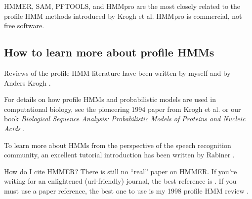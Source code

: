 HMMER, SAM, PFTOOLS, and HMMpro are the most closely related to the
profile HMM methods introduced by Krogh et al. HMMpro is commercial,
not free software.

\subsection{How to learn more about profile HMMs}

Reviews of the profile HMM literature have been written by myself
\cite{Eddy96,Eddy98} and by Anders Krogh \cite{Krogh98}.

For details on how profile HMMs and probabilistic models are used in
computational biology, see the pioneering 1994 paper from Krogh et
al. \cite{Krogh94} or our book \emph{Biological Sequence Analysis:
Probabilistic Models of Proteins and Nucleic Acids} \cite{Durbin98}.

To learn more about HMMs from the perspective of the speech
recognition community, an excellent tutorial introduction has been
written by Rabiner \cite{Rabiner89}.

\begin{srefaq}{How do I cite HMMER?}
There is still no ``real'' paper on HMMER. If you're writing for an
enlightened (url-friendly) journal, the best reference is
.
If you must use a paper reference, the best one to use is my 1998
profile HMM review \cite{Eddy98}.
\end{srefaq}
